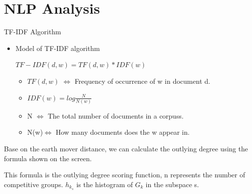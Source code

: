 \documentclass[
 size=14pt,
 paper=smartboard,  %
 mode=present, 		%
 display=slides, 	%
 style=tuliplab,  	%
 pauseslide,
 fleqn,leqno]{powerdot}
\begin{document}



\section{NLP Analysis}

\begin{slide}[toc=,bm=]{TF-IDF Algorithm}

  \begin{itemize}
  \item
  Model of TF-IDF algorithm
  
  \vspace{1.2cm}
  
  \begin{centering}
   
  $ TF-IDF (d, w) = TF (d, w) *IDF(w)$
  
  
  \end{centering}
  
  \begin{itemize}
  
  \item
  $TF(d,w)$ $\Leftrightarrow$ Frequency of occurrence of w in document d.
  \item
  $IDF(w) = log\frac{N}{N(w)}$
  \item
  N $\Leftrightarrow$ The total number of documents in a corpuss.
  \item
  N(w)$\Leftrightarrow$ How many documents does the w appear in.
  
  \end{itemize}
  \end{itemize}
  
  \begin{note}
  Base on the earth mover distance,
  we can calculate the outlying degree using the formula shown on the screen.
  
  This formula is the outlying degree scoring function,
  n represents the number of competitive groups.
  $h_{k_s}$ is the histogram of $G_k$ in the subspace s.
  \end{note}
  
  \end{slide}
\end{document}
